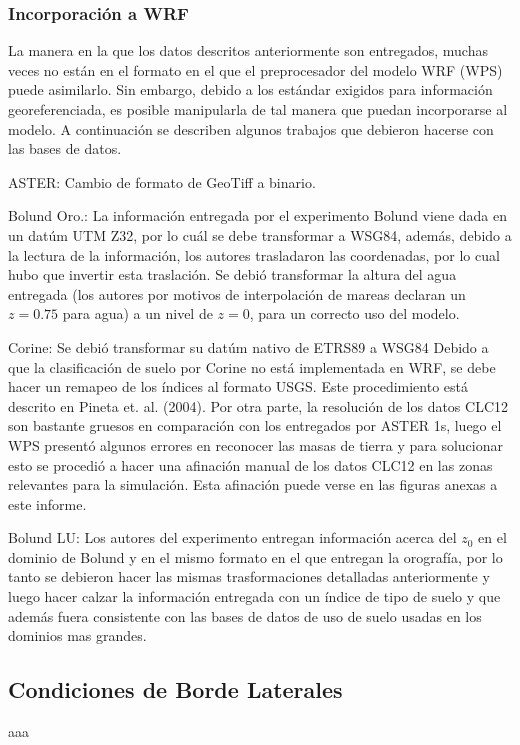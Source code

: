 \subsubsection{Incorporación a WRF}
La manera en la que los datos descritos anteriormente son entregados, muchas veces no están en el formato en el que el preprocesador del modelo WRF (WPS) puede asimilarlo. Sin embargo, debido a los estándar exigidos para información georeferenciada, es posible manipularla de tal manera que puedan incorporarse al modelo. A continuación se describen algunos trabajos que debieron hacerse con las bases de datos.
\begin{enumerate*}
	\item ASTER: Cambio de formato de GeoTiff a binario.
	\item Bolund Oro.: La información entregada por el experimento Bolund viene dada en un datúm UTM Z32, por lo cuál se debe transformar a WSG84, además, debido a la lectura de la información, los autores trasladaron las coordenadas, por lo cual hubo que invertir esta traslación. Se debió transformar la altura del agua entregada (los autores por motivos de interpolación de mareas declaran un $z=0.75$ para agua) a un nivel de $z=0$, para un correcto uso del modelo. 
	\item Corine: Se debió transformar su datúm nativo de ETRS89 a WSG84 Debido a que la clasificación de suelo por Corine no está implementada en WRF, se debe hacer un remapeo de los índices al formato USGS. Este procedimiento está descrito en Pineta et. al. (2004). Por otra parte, la resolución de los datos CLC12 son bastante gruesos en comparación con los entregados por ASTER 1s, luego el WPS presentó algunos errores en reconocer las masas de tierra y para solucionar esto se procedió a hacer una afinación manual de los datos CLC12 en las zonas relevantes para la simulación. Esta afinación puede verse en las figuras anexas a este informe.
	\item Bolund LU: Los autores del experimento entregan información acerca del $z_0$ en el dominio de Bolund y en el mismo formato en el que entregan la orografía, por lo tanto se debieron hacer las mismas trasformaciones detalladas anteriormente y luego hacer calzar la información entregada con un índice de tipo de suelo y que además fuera consistente con las bases de datos de uso de suelo usadas en los dominios mas grandes.
\end{enumerate*}
\subsection{Condiciones de Borde Laterales}
aaa
